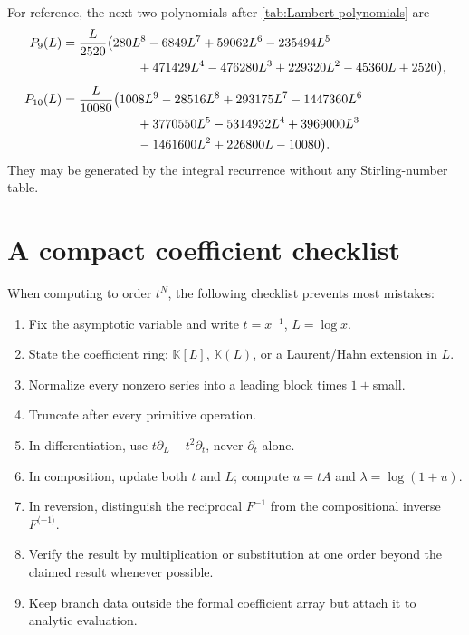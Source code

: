 \documentclass[11pt]{article}
\theoremstyle{pltheorem}
\newcommand{\K}{\mathbb K}
\newcommand{\rev}{\langle-1\rangle}
\begin{document}
For reference, the next two polynomials after \cref{tab:Lambert-polynomials} are
\begin{align}
 P_9(L)={}&\frac{L}{2520}\bigl(
 280L^8-6849L^7+59062L^6-235494L^5
 \notag\\
 &\hspace{4.6em}+471429L^4-476280L^3+229320L^2-45360L+2520
 \bigr),\label{eq:P9}\\[0.4em]
 P_{10}(L)={}&\frac{L}{10080}\bigl(
 1008L^9-28516L^8+293175L^7-1447360L^6
 \notag\\
 &\hspace{4.6em}+3770550L^5-5314932L^4+3969000L^3
 \notag\\
 &\hspace{4.6em}-1461600L^2+226800L-10080
 \bigr).
 \label{eq:P10}
\end{align}
They may be generated by the integral recurrence without any Stirling-number table.

\section{A compact coefficient checklist}
\label{app:checklist}

When computing to order \(t^N\), the following checklist prevents most mistakes:
\begin{enumerate}
\item Fix the asymptotic variable and write \(t=x^{-1}\), \(L=\log x\).
\item State the coefficient ring: \(\K[L]\), \(\K(L)\), or a Laurent/Hahn extension in \(L\).
\item Normalize every nonzero series into a leading block times \(1+\)small.
\item Truncate after every primitive operation.
\item In differentiation, use \(t\partial_L-t^2\partial_t\), never \(\partial_t\) alone.
\item In composition, update both \(t\) and \(L\); compute
\(u=tA\) and \(\lambda=\log(1+u)\).
\item In reversion, distinguish the reciprocal \(F^{-1}\) from the compositional inverse \(F^{\rev}\).
\item Verify the result by multiplication or substitution at one order beyond the claimed result whenever possible.
\item Keep branch data outside the formal coefficient array but attach it to analytic evaluation.
\end{enumerate}
\end{document}
